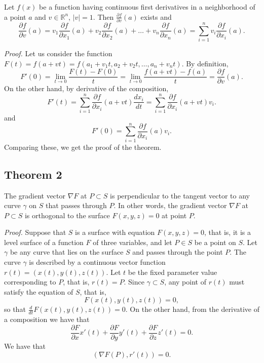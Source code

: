 \documentclass{article}
\begin{document}
\begin{theorem}
Let $f(x)$ be a function having continuous first derivatives in a neighborhood of a point $a$ and $v \in \mathbb{R}^n$, $|v| = 1$. Then $\frac{\partial f}{\partial v}(a)$ exists and
\[
\frac{\partial f}{\partial v}(a) = v_1 \frac{\partial f}{\partial x_1}(a) + v_2 \frac{\partial f}{\partial x_2}(a) + \dots + v_n \frac{\partial f}{\partial x_n}(a) = \sum_{i=1}^{n} v_i \frac{\partial f}{\partial x_i}(a).
\]
\end{theorem}

\vspace{1em}

\textit{Proof.} Let us consider the function $F(t) = f(a + vt) = f(a_1 + v_1 t, a_2 + v_2 t, \dots, a_n + v_n t)$. By definition,
\[
F'(0) = \lim_{t \to 0} \frac{F(t) - F(0)}{t} = \lim_{t \to 0} \frac{f(a + vt) - f(a)}{t} = \frac{\partial f}{\partial v}(a).
\]
On the other hand, by derivative of the composition,
\[
F'(t) = \sum_{i=1}^{n} \frac{\partial f}{\partial x_i}(a + vt) \frac{dx_i}{dt} = \sum_{i=1}^{n} \frac{\partial f}{\partial x_i}(a + vt) v_i.
\]
and
\[
F'(0) = \sum_{i=1}^{n} \frac{\partial f}{\partial x_i}(a) v_i.
\]
Comparing these, we get the proof of the theorem.

\subsection*{Theorem 2}

\begin{theorem}
The gradient vector $\nabla F$ at $P \subset S$ is perpendicular to the tangent vector to any curve $\gamma$ on $S$ that passes through $P$. In other words, the gradient vector $\nabla F$ at $P \subset S$ is orthogonal to the surface $F(x, y, z) = 0$ at point $P$.
\end{theorem}

\vspace{1em}

\textit{Proof.} Suppose that $S$ is a surface with equation $F(x, y, z) = 0$, that is, it is a level surface of a function $F$ of three variables, and let $P \in S$ be a point on $S$. Let $\gamma$ be any curve that lies on the surface $S$ and passes through the point $P$. The curve $\gamma$ is described by a continuous vector function $r(t) = (x(t), y(t), z(t))$. Let $t$ be the fixed parameter value corresponding to $P$, that is, $r(t) = P$. Since $\gamma \subset S$, any point of $r(t)$ must satisfy the equation of $S$, that is,
\[
F(x(t), y(t), z(t)) = 0,
\]
so that $\frac{d}{dt}F(x(t), y(t), z(t)) = 0$. On the other hand, from the derivative of a composition we have that
\[
\frac{\partial F}{\partial x} x'(t) + \frac{\partial F}{\partial y} y'(t) + \frac{\partial F}{\partial z} z'(t) = 0.
\]
We have that
\[
(\nabla F(P), r'(t)) = 0.
\]
\end{document}
